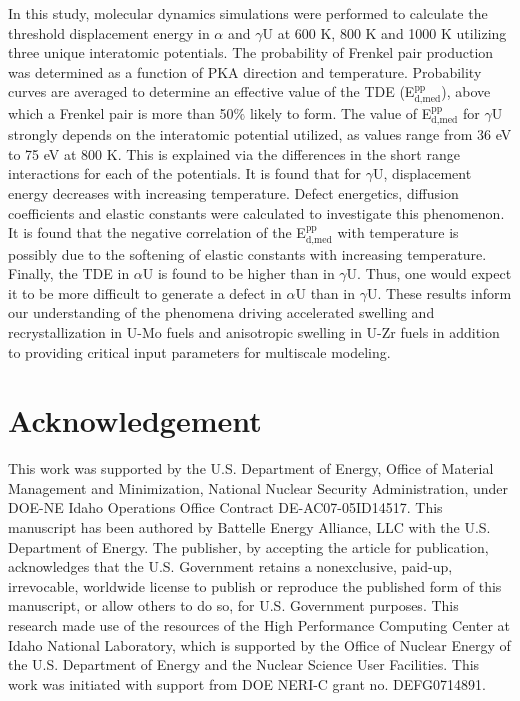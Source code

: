 \documentclass[review]{elsarticle}
\begin{document}
In this study, molecular dynamics simulations were performed to calculate the threshold displacement energy in $\alpha$ and $\gamma$U at 600 K, 800 K and 1000 K utilizing three unique interatomic potentials. The probability of Frenkel pair production was determined as a function of PKA direction and temperature. Probability curves are averaged to determine an effective value of the TDE (E$^{\textrm{pp}}_{\textrm{d,med}}$), above which a Frenkel pair is more than 50$\%$ likely to form. The value of E$^{\textrm{pp}}_{\textrm{d,med}}$ for $\gamma$U strongly depends on the interatomic potential utilized, as values range from 36 eV to 75 eV at 800 K. This is explained via the differences in the short range interactions for each of the potentials. It is found that for $\gamma$U, displacement energy decreases with increasing temperature. Defect energetics, diffusion coefficients and elastic constants were calculated to investigate this phenomenon. It is found that the negative correlation of the E$^{\textrm{pp}}_{\textrm{d,med}}$ with temperature is possibly due to the softening of elastic constants with increasing temperature. Finally, the TDE in $\alpha$U is found to be higher than in $\gamma$U. Thus, one would expect it to be more difficult to generate a defect in $\alpha$U than in $\gamma$U. These results inform our understanding of the phenomena driving accelerated swelling and recrystallization in U-Mo fuels and anisotropic swelling in U-Zr fuels in addition to providing critical input parameters for multiscale modeling.

\section{Acknowledgement}
This work was supported by the U.S. Department of Energy, Office of Material Management and Minimization, National Nuclear Security Administration, under DOE-NE Idaho Operations Office Contract DE-AC07-05ID14517. This manuscript has been authored by Battelle Energy Alliance, LLC with the U.S. Department of Energy. The publisher, by accepting the article for publication, acknowledges that the U.S. Government retains a nonexclusive, paid-up, irrevocable, worldwide license to publish or reproduce the published form of this manuscript, or allow others to do so, for U.S. Government purposes. This research made use of the resources of the High Performance Computing Center at Idaho National Laboratory, which is supported by the Office of Nuclear Energy of the U.S. Department of Energy and the Nuclear Science User Facilities. This work was initiated with support from DOE NERI-C grant no. DEFG0714891.
\end{document}
